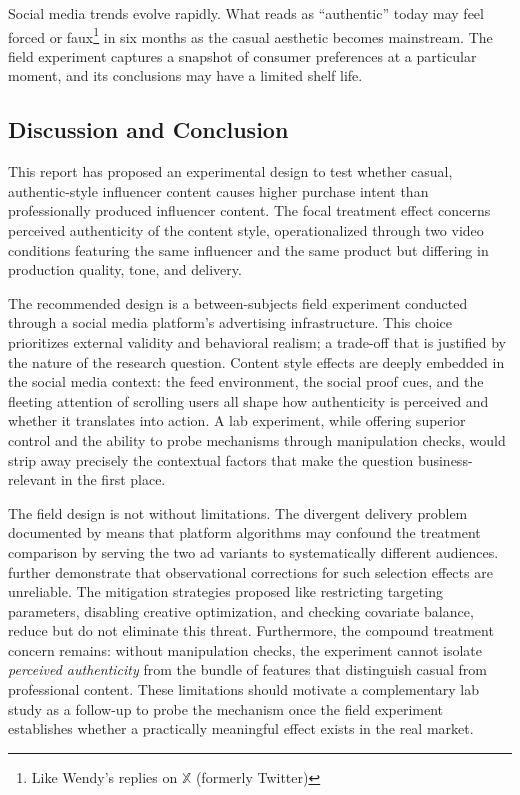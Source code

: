 \documentclass[10pt]{article}
\begin{document}
Social media trends evolve rapidly. What reads as ``authentic'' today may feel forced or faux\footnote{Like Wendy's replies on $\mathbb{X}$ (formerly Twitter)} in six months as the casual aesthetic becomes mainstream. The field experiment captures a snapshot of consumer preferences at a particular moment, and its conclusions may have a limited shelf life.

\subsection{Discussion and Conclusion}

This report has proposed an experimental design to test whether casual, authentic-style influencer content causes higher purchase intent than professionally produced influencer content. The focal treatment effect concerns perceived authenticity of the content style, operationalized through two video conditions featuring the same influencer and the same product but differing in production quality, tone, and delivery.

The recommended design is a between-subjects field experiment conducted through a social media platform's advertising infrastructure. This choice prioritizes external validity and behavioral realism; a trade-off that is justified by the nature of the research question. Content style effects are deeply embedded in the social media context: the feed environment, the social proof cues, and the fleeting attention of scrolling users all shape how authenticity is perceived and whether it translates into action. A lab experiment, while offering superior control and the ability to probe mechanisms through manipulation checks, would strip away precisely the contextual factors that make the question business-relevant in the first place.

The field design is not without limitations. The divergent delivery problem documented by \textcite{braun2025abtesting} means that platform algorithms may confound the treatment comparison by serving the two ad variants to systematically different audiences. \textcite{gordon2019comparison} further demonstrate that observational corrections for such selection effects are unreliable. The mitigation strategies proposed like restricting targeting parameters, disabling creative optimization, and checking covariate balance, reduce but do not eliminate this threat. Furthermore, the compound treatment concern remains: without manipulation checks, the experiment cannot isolate \textit{perceived authenticity} from the bundle of features that distinguish casual from professional content. These limitations should motivate a complementary lab study as a follow-up to probe the mechanism once the field experiment establishes whether a practically meaningful effect exists in the real market.
\end{document}
